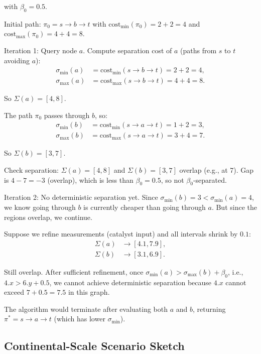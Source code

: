 \documentclass[twocolumn,11pt,a4paper]{article}
\theoremstyle{definition}
\begin{document}
with $\beta_0 = 0.5$.

Initial path: $\pi_0 = s \to b \to t$ with $\text{cost}_{\min}(\pi_0) = 2 + 2 = 4$ and $\text{cost}_{\max}(\pi_0) = 4 + 4 = 8$.

Iteration 1: Query node $a$. Compute separation cost of $a$ (paths from $s$ to $t$ avoiding $a$):
\begin{align}
\sigma_{\min}(a) &= \text{cost}_{\min}(s \to b \to t) = 2 + 2 = 4, \\
\sigma_{\max}(a) &= \text{cost}_{\max}(s \to b \to t) = 4 + 4 = 8.
\end{align}

So $\Sigma(a) = [4, 8]$.

The path $\pi_0$ passes through $b$, so:
\begin{align}
\sigma_{\min}(b) &= \text{cost}_{\min}(s \to a \to t) = 1 + 2 = 3, \\
\sigma_{\max}(b) &= \text{cost}_{\max}(s \to a \to t) = 3 + 4 = 7.
\end{align}

So $\Sigma(b) = [3, 7]$.

Check separation: $\Sigma(a) = [4, 8]$ and $\Sigma(b) = [3, 7]$ overlap (e.g., at 7). Gap is $4 - 7 = -3$ (overlap), which is less than $\beta_0 = 0.5$, so not $\beta_0$-separated.

Iteration 2: No deterministic separation yet. Since $\sigma_{\min}(b) = 3 < \sigma_{\min}(a) = 4$, we know going through $b$ is currently cheaper than going through $a$. But since the regions overlap, we continue.

Suppose we refine measurements (catalyst input) and all intervals shrink by $0.1$:
\begin{align}
\Sigma(a) &\to [4.1, 7.9], \\
\Sigma(b) &\to [3.1, 6.9].
\end{align}

Still overlap. After sufficient refinement, once $\sigma_{\min}(a) > \sigma_{\max}(b) + \beta_0$, i.e., $4.x > 6.y + 0.5$, we cannot achieve deterministic separation because $4.x$ cannot exceed $7 + 0.5 = 7.5$ in this graph.

The algorithm would terminate after evaluating both $a$ and $b$, returning $\pi^* = s \to a \to t$ (which has lower $\sigma_{\min}$).

\subsection{Continental-Scale Scenario Sketch}
\end{document}
